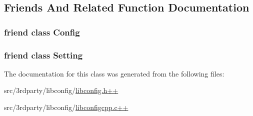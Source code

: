\subsection{Friends And Related Function Documentation}
\hypertarget{classlibconfig_1_1SettingTypeException_ac3da7e21a05bf8852638db7e4dd1b81a}{
\subsubsection[{Config}]{\setlength{\rightskip}{0pt plus 5cm}friend class {\bf Config}\hspace{0.3cm}{\ttfamily [friend]}}}\label{classlibconfig_1_1SettingTypeException_ac3da7e21a05bf8852638db7e4dd1b81a}
\hypertarget{classlibconfig_1_1SettingTypeException_a9aa0bc1c3d297cabf9a1848178294d38}{
\subsubsection[{Setting}]{\setlength{\rightskip}{0pt plus 5cm}friend class {\bf Setting}\hspace{0.3cm}{\ttfamily [friend]}}}\label{classlibconfig_1_1SettingTypeException_a9aa0bc1c3d297cabf9a1848178294d38}


The documentation for this class was generated from the following files\-:\begin{DoxyCompactItemize}
\item 
src/3rdparty/libconfig/\hyperlink{libconfig_8h_09_09}{libconfig.\-h++}\item 
src/3rdparty/libconfig/\hyperlink{libconfigcpp_8c_09_09}{libconfigcpp.\-c++}\end{DoxyCompactItemize}

